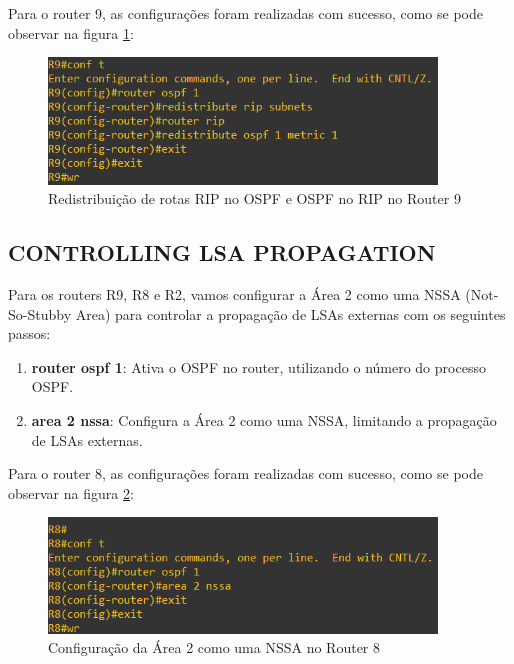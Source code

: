 \documentclass[11pt,english, openright, oneside]{book}
\begin{document}
Para o router 9, as configurações foram realizadas com sucesso, como se pode observar na figura \ref{fig:config32}:
\vspace{0.2cm}

\begin{figure}[H]
  \centering
  \includegraphics[width=0.92\textwidth]{imagens/Tarefa4/19.redistribute_R9.png}
  \caption{Redistribuição de rotas RIP no OSPF e OSPF no RIP no Router 9}
  \label{fig:config32}
\end{figure}
\vspace{0.2cm}

\subsection{CONTROLLING LSA PROPAGATION}
\vspace{0.2cm}

Para os routers R9, R8 e R2, vamos configurar a Área 2 como uma NSSA (Not-So-Stubby Area) para controlar a propagação de LSAs externas com os seguintes passos:
\vspace{0.2cm}

\begin{enumerate}
  \item \textbf{router ospf 1}: Ativa o OSPF no router, utilizando o número do processo OSPF.
  \item \textbf{area 2 nssa}: Configura a Área 2 como uma NSSA, limitando a propagação de LSAs externas.
\end{enumerate}
\vspace{0.2cm}

Para o router 8, as configurações foram realizadas com sucesso, como se pode observar na figura \ref{fig:config33}:
\vspace{0.2cm}

\begin{figure}[H]
  \centering
  \includegraphics[width=0.92\textwidth]{imagens/Tarefa4/20.nssa_R8.png}
  \caption{Configuração da Área 2 como uma NSSA no Router 8}
  \label{fig:config33}
\end{figure}
\vspace{0.2cm}
\end{document}
